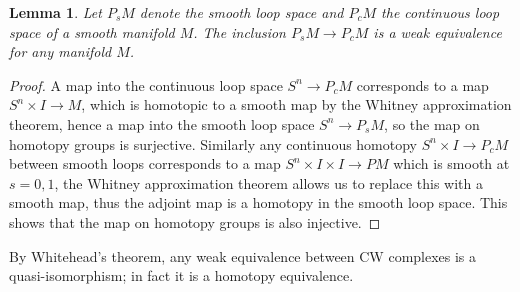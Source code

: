 \documentclass{scrartcl}
\theoremstyle{plain}
\newtheorem{lemma}[theorem]{Lemma}
\theoremstyle{definition}
\newtheorem{remark}[theorem]{Remark}
\newcommand{\APL}{A_{PL}}
\newcommand{\from}{\leftarrow}
\DeclareMathOperator{\Map}{Map}
\begin{document}
\begin{lemma}
Let $P_sM$ denote the smooth loop space and $P_cM$ the continuous loop space of a smooth manifold $M$. The inclusion $P_sM\to P_cM$ is a weak equivalence for any manifold $M$. 
\end{lemma}
\begin{proof}
    A map into the continuous loop space $S^n\to P_cM$ corresponds to a map $S^n\times I\to M$, which is homotopic to a smooth map by the Whitney approximation theorem, hence a map into the smooth loop space $S^n\to P_sM$, so the map on homotopy groups is surjective. Similarly any continuous homotopy $S^n\times I\to P_cM$ between smooth loops corresponds to a map $S^n\times I \times I\to PM$ which is smooth at $s=0, 1$, the Whitney approximation theorem allows us to replace this with a smooth map, thus the adjoint map is a homotopy in the smooth loop space. This shows that the map on homotopy groups is also injective. %
\end{proof}

By Whitehead's theorem, any weak equivalence between CW complexes is a quasi-isomorphism; in fact it is a homotopy equivalence. 



\end{document}
